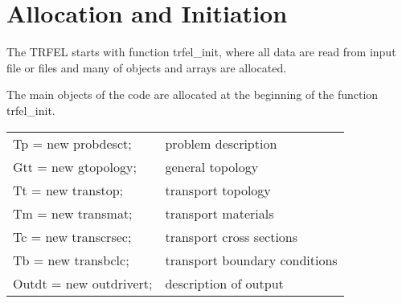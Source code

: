 \section{Allocation and Initiation}

The TRFEL starts with function trfel\_init, where all data are read
from input file or files and many of objects and arrays are allocated.

The main objects of the code are allocated at the beginning
of the function trfel\_init.
\begin{center}
\begin{tabular}{ll}
Tp  = new probdesct;  & problem description
\\
Gtt = new gtopology; & general topology
\\
Tt  = new transtop; & transport topology
\\
Tm  = new transmat; & transport materials
\\
Tc  = new transcrsec; & transport cross sections
\\
Tb  = new transbclc; & transport boundary conditions
\\
Outdt = new outdrivert; & description of output
\end{tabular}
\end{center}

